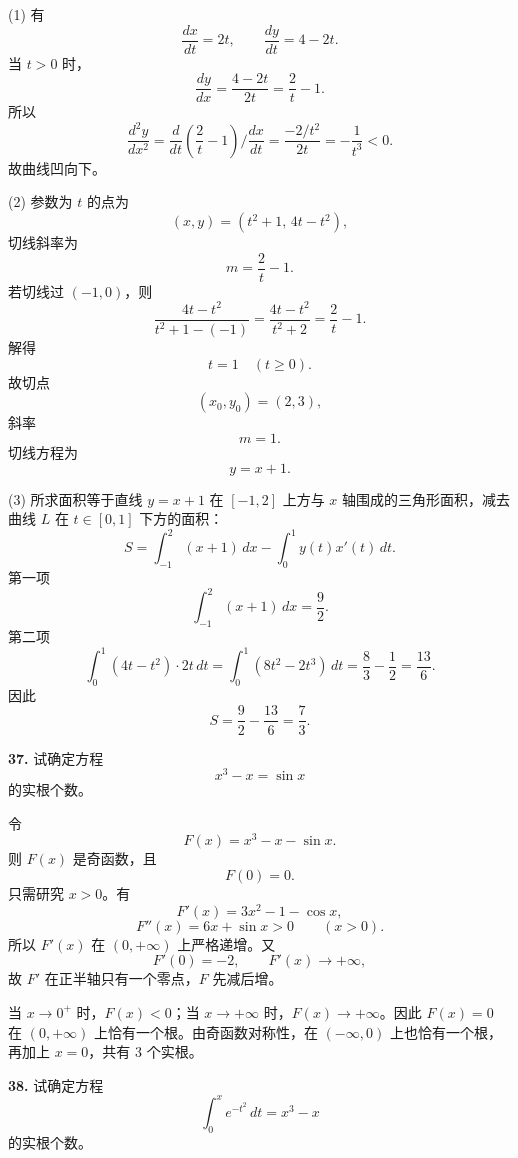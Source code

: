 \begin{solutionblock}
(1) 有
\[
\frac{dx}{dt}=2t,\qquad \frac{dy}{dt}=4-2t.
\]
当 \(t>0\) 时，
\[
\frac{dy}{dx}=\frac{4-2t}{2t}=\frac2t-1.
\]
所以
\[
\frac{d^2y}{dx^2}
=\frac{d}{dt}\left(\frac2t-1\right)\bigg/\frac{dx}{dt}
=\frac{-2/t^2}{2t}
=-\frac1{t^3}<0.
\]
故曲线凹向下。

(2) 参数为 \(t\) 的点为
\[
(x,y)=(t^2+1,\,4t-t^2),
\]
切线斜率为
\[
m=\frac2t-1.
\]
若切线过 \((-1,0)\)，则
\[
\frac{4t-t^2}{t^2+1-(-1)}
=\frac{4t-t^2}{t^2+2}
=\frac2t-1.
\]
解得
\[
t=1\quad(t\ge0).
\]
故切点
\[
(x_0,y_0)=(2,3),
\]
斜率
\[
m=1.
\]
切线方程为
\[
y=x+1.
\]

(3) 所求面积等于直线 \(y=x+1\) 在 \([-1,2]\) 上方与 \(x\) 轴围成的三角形面积，减去曲线 \(L\) 在 \(t\in[0,1]\) 下方的面积：
\[
S=\int_{-1}^{2}(x+1)\,dx-\int_{0}^{1}y(t)x'(t)\,dt.
\]
第一项
\[
\int_{-1}^{2}(x+1)\,dx=\frac92.
\]
第二项
\[
\int_0^1(4t-t^2)\cdot2t\,dt
=\int_0^1(8t^2-2t^3)\,dt
=\frac83-\frac12=\frac{13}{6}.
\]
因此
\[
S=\frac92-\frac{13}{6}
=\frac{7}{3}.
\]
\end{solutionblock}

\begin{problemblock}
\textbf{37.} 试确定方程
\[
x^3-x=\sin x
\]
的实根个数。
\end{problemblock}

\begin{solutionblock}
令
\[
F(x)=x^3-x-\sin x.
\]
则 \(F(x)\) 是奇函数，且
\[
F(0)=0.
\]
只需研究 \(x>0\)。有
\[
F'(x)=3x^2-1-\cos x,
\]
\[
F''(x)=6x+\sin x>0\qquad(x>0).
\]
所以 \(F'(x)\) 在 \((0,+\infty)\) 上严格递增。又
\[
F'(0)=-2,\qquad F'(x)\to+\infty,
\]
故 \(F'\) 在正半轴只有一个零点，\(F\) 先减后增。

当 \(x\to0^+\) 时，\(F(x)<0\)；当 \(x\to+\infty\) 时，\(F(x)\to+\infty\)。因此 \(F(x)=0\) 在 \((0,+\infty)\) 上恰有一个根。由奇函数对称性，在 \((-\infty,0)\) 上也恰有一个根，再加上 \(x=0\)，共有 3 个实根。
\end{solutionblock}

\begin{problemblock}
\textbf{38.} 试确定方程
\[
\int_0^x e^{-t^2}\,dt=x^3-x
\]
的实根个数。
\end{problemblock}

